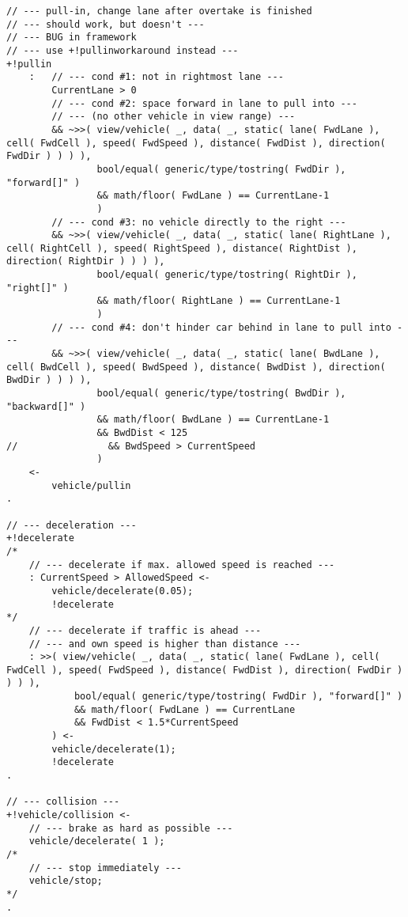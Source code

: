 \begin{lstlisting}
// --- pull-in, change lane after overtake is finished
// --- should work, but doesn't ---
// --- BUG in framework
// --- use +!pullinworkaround instead ---
+!pullin
    :   // --- cond #1: not in rightmost lane ---
        CurrentLane > 0
        // --- cond #2: space forward in lane to pull into ---
        // --- (no other vehicle in view range) ---
        && ~>>( view/vehicle( _, data( _, static( lane( FwdLane ), cell( FwdCell ), speed( FwdSpeed ), distance( FwdDist ), direction( FwdDir ) ) ) ),
                bool/equal( generic/type/tostring( FwdDir ), "forward[]" ) 
                && math/floor( FwdLane ) == CurrentLane-1
                )
        // --- cond #3: no vehicle directly to the right ---
        && ~>>( view/vehicle( _, data( _, static( lane( RightLane ), cell( RightCell ), speed( RightSpeed ), distance( RightDist ), direction( RightDir ) ) ) ),
                bool/equal( generic/type/tostring( RightDir ), "right[]" ) 
                && math/floor( RightLane ) == CurrentLane-1
                )
        // --- cond #4: don't hinder car behind in lane to pull into ---
        && ~>>( view/vehicle( _, data( _, static( lane( BwdLane ), cell( BwdCell ), speed( BwdSpeed ), distance( BwdDist ), direction( BwdDir ) ) ) ),
                bool/equal( generic/type/tostring( BwdDir ), "backward[]" ) 
                && math/floor( BwdLane ) == CurrentLane-1
                && BwdDist < 125
//                && BwdSpeed > CurrentSpeed 
                )
    <-
        vehicle/pullin
.

// --- deceleration ---
+!decelerate 
/*
    // --- decelerate if max. allowed speed is reached ---
    : CurrentSpeed > AllowedSpeed <-
        vehicle/decelerate(0.05);
        !decelerate
*/
    // --- decelerate if traffic is ahead ---
    // --- and own speed is higher than distance ---
    : >>( view/vehicle( _, data( _, static( lane( FwdLane ), cell( FwdCell ), speed( FwdSpeed ), distance( FwdDist ), direction( FwdDir ) ) ) ), 
            bool/equal( generic/type/tostring( FwdDir ), "forward[]" ) 
            && math/floor( FwdLane ) == CurrentLane
            && FwdDist < 1.5*CurrentSpeed
        ) <-
        vehicle/decelerate(1);
        !decelerate
.

// --- collision ---
+!vehicle/collision <-
    // --- brake as hard as possible ---
    vehicle/decelerate( 1 );
/*
    // --- stop immediately ---
    vehicle/stop;
*/
.
\end{lstlisting}


\newpage


